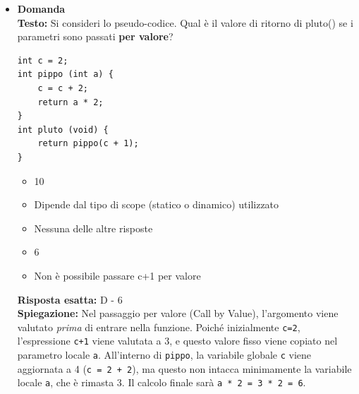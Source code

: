 \documentclass[12pt, a4paper]{article}
\newcounter{domandateoria}
\begin{document}
\begin{itemize}
    \item {}\textbf{Domanda \thedomandateoria} \\
    \textbf{Testo:} Si consideri lo pseudo-codice. Qual è il valore di ritorno di pluto() se i parametri sono passati \textbf{per valore}?
\begin{verbatim}
int c = 2;
int pippo (int a) {
    c = c + 2;
    return a * 2;
}
int pluto (void) {
    return pippo(c + 1);
}
\end{verbatim}
    \begin{itemize}
        \item[A)] 10
        \item[B)] Dipende dal tipo di scope (statico o dinamico) utilizzato
        \item[C)] Nessuna delle altre risposte
        \item[D)] 6
        \item[E)] Non è possibile passare c+1 per valore
    \end{itemize}
    \textbf{Risposta esatta:} D - 6 \\
    \textbf{Spiegazione:} Nel passaggio per valore (Call by Value), l'argomento viene valutato \textit{prima} di entrare nella funzione. Poiché inizialmente \texttt{c=2}, l'espressione \texttt{c+1} viene valutata a 3, e questo valore fisso viene copiato nel parametro locale \texttt{a}. All'interno di \texttt{pippo}, la variabile globale \texttt{c} viene aggiornata a 4 (\texttt{c = 2 + 2}), ma questo non intacca minimamente la variabile locale \texttt{a}, che è rimasta 3. Il calcolo finale sarà \texttt{a * 2 = 3 * 2 = 6}.
    \vspace{0.3cm}

\newpage


\end{itemize}
\end{document}
